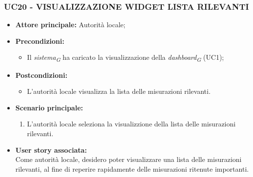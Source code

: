 \subsubsection{UC20 - VISUALIZZAZIONE WIDGET LISTA RILEVANTI}
\begin{itemize}
      \item \textbf{Attore principale:} Autorità locale;
      \item \textbf{Precondizioni:}
            \begin{itemize}
                  \item Il \textit{sistema}\textsubscript{\textit{G}} ha caricato la visualizzazione della \textit{dashboard}\textsubscript{\textit{G}} (UC1);
            \end{itemize}
      \item \textbf{Postcondizioni:}
            \begin{itemize}
                  \item L'autorità locale visualizza la lista delle misurazioni rilevanti.
            \end{itemize}
      \item \textbf{Scenario principale:}
            \begin{enumerate}
                  \item L'autorità locale seleziona la visualizzione della lista delle misurazioni rilevanti.
            \end{enumerate}
      \item \textbf{User story associata:} \\
      Come autorità locale, desidero poter visualizzare una lista delle misurazioni rilevanti, al fine di reperire rapidamente delle misurazioni ritenute importanti.
\end{itemize}